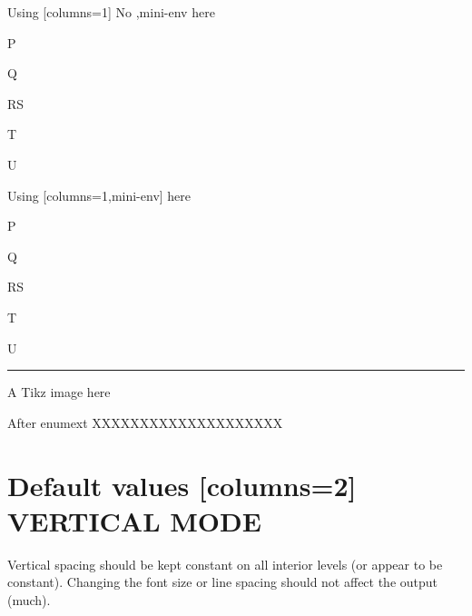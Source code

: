 \documentclass[10pt]{article}
\begin{document}
\begin{enumext}[nosep]
\item Using [columns=1] No ,mini-env here

  \begin{enumext}[columns=1]%
    \item  P \item Q \item RS \item T \item U
  \end{enumext}

\item Using [columns=1,mini-env] here

  \begin{enumext}[columns=1,mini-env=0.4\linewidth]%
    \item  P \item Q \item RS \item T \item U
    \miniright
    \rule{30pt}{20pt}\par
    A Tikz image here
  \end{enumext}

\end{enumext}
After enumext XXXXXXXXXXXXXXXXXXXX

\newpage

\section{Default values [columns=2] VERTICAL MODE}

Vertical spacing should be kept constant on all interior levels (or
appear to be constant). Changing the font size or line spacing should
not affect the output (much).
\end{document}
